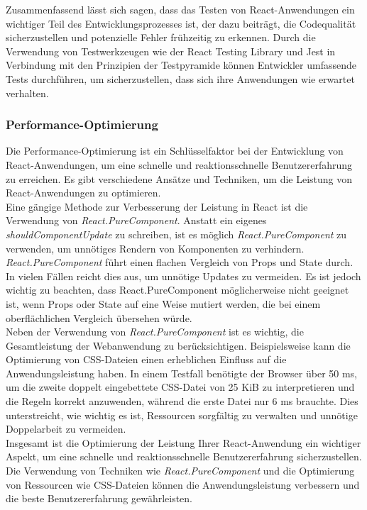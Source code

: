 Zusammenfassend lässt sich sagen, dass das Testen von React-Anwendungen ein wichtiger Teil des Entwicklungsprozesses ist, der dazu beiträgt, die Codequalität sicherzustellen und potenzielle Fehler frühzeitig zu erkennen. Durch die Verwendung von Testwerkzeugen wie der React Testing Library und Jest in Verbindung mit den Prinzipien der Testpyramide können Entwickler umfassende Tests durchführen, um sicherzustellen, dass sich ihre Anwendungen wie erwartet verhalten.

\subsubsection{Performance-Optimierung}
Die Performance-Optimierung ist ein Schlüsselfaktor bei der Entwicklung von React-Anwendungen, um eine schnelle und reaktionsschnelle Benutzererfahrung zu erreichen. Es gibt verschiedene Ansätze und Techniken, um die Leistung von React-Anwendungen zu optimieren.\\
Eine gängige Methode zur Verbesserung der Leistung in React ist die Verwendung von \emph{React.PureComponent}. Anstatt ein eigenes \emph{shouldComponentUpdate} zu schreiben, ist es möglich \emph{React.PureComponent} zu verwenden, um unnötiges Rendern von Komponenten zu verhindern. \emph{React.PureComponent} führt einen flachen Vergleich von Props und State durch. In vielen Fällen reicht dies aus, um unnötige Updates zu vermeiden.
Es ist jedoch wichtig zu beachten, dass React.PureComponent möglicherweise nicht geeignet ist, wenn Props oder State auf eine Weise mutiert werden, die bei einem oberflächlichen Vergleich übersehen würde.\\
Neben der Verwendung von \emph{React.PureComponent} ist es wichtig, die Gesamtleistung der Webanwendung zu berücksichtigen. Beispielsweise kann die Optimierung von CSS-Dateien einen erheblichen Einfluss auf die Anwendungsleistung haben. In einem Testfall benötigte der Browser über 50 ms, um die zweite doppelt eingebettete CSS-Datei von 25 KiB zu interpretieren und die Regeln korrekt anzuwenden, während die erste Datei nur 6 ms brauchte. Dies unterstreicht, wie wichtig es ist, Ressourcen sorgfältig zu verwalten und unnötige Doppelarbeit zu vermeiden.\cite{react-performance}\\

Insgesamt ist die Optimierung der Leistung Ihrer React-Anwendung ein wichtiger Aspekt, um eine schnelle und reaktionsschnelle Benutzererfahrung sicherzustellen. Die Verwendung von Techniken wie \emph{React.PureComponent} und die Optimierung von Ressourcen wie CSS-Dateien können die Anwendungsleistung verbessern und die beste Benutzererfahrung gewährleisten.\cite{css-performance}\\


